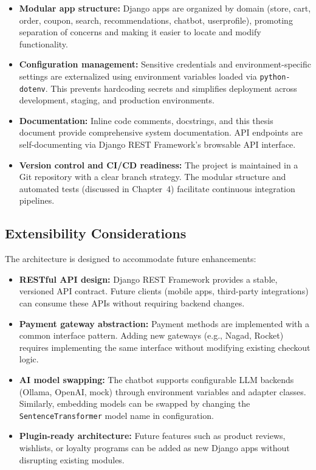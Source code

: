 \begin{itemize}
  \item \textbf{Modular app structure:} Django apps are organized by domain (store, cart, order, coupon, search, recommendations, chatbot, userprofile), promoting separation of concerns and making it easier to locate and modify functionality.
  
  \item \textbf{Configuration management:} Sensitive credentials and environment-specific settings are externalized using environment variables loaded via \texttt{python-dotenv}. This prevents hardcoding secrets and simplifies deployment across development, staging, and production environments.
  
  \item \textbf{Documentation:} Inline code comments, docstrings, and this thesis document provide comprehensive system documentation. API endpoints are self-documenting via Django REST Framework's browsable API interface.
  
  \item \textbf{Version control and CI/CD readiness:} The project is maintained in a Git repository with a clear branch strategy. The modular structure and automated tests (discussed in Chapter~4) facilitate continuous integration pipelines.
\end{itemize}

\subsection*{Extensibility Considerations}
The architecture is designed to accommodate future enhancements:

\begin{itemize}
  \item \textbf{RESTful API design:} Django REST Framework provides a stable, versioned API contract. Future clients (mobile apps, third-party integrations) can consume these APIs without requiring backend changes.
  
  \item \textbf{Payment gateway abstraction:} Payment methods are implemented with a common interface pattern. Adding new gateways (e.g., Nagad, Rocket) requires implementing the same interface without modifying existing checkout logic.
  
  \item \textbf{AI model swapping:} The chatbot supports configurable LLM backends (Ollama, OpenAI, mock) through environment variables and adapter classes. Similarly, embedding models can be swapped by changing the \texttt{SentenceTransformer} model name in configuration.
  
  \item \textbf{Plugin-ready architecture:} Future features such as product reviews, wishlists, or loyalty programs can be added as new Django apps without disrupting existing modules.
\end{itemize}

